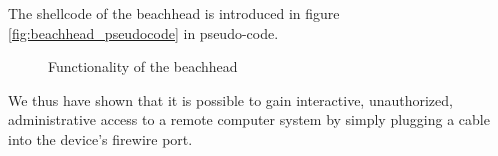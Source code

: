 The shellcode of the beachhead
is introduced in figure \ref{fig:beachhead_pseudocode} in pseudo-code. 

\begin{figure}[htb] \begin{center}

	\epsfysize 4.5cm


	\caption{Functionality of the beachhead}

	\label{fig:functionality_beachhead}

\end{center}\end{figure}


We thus have shown that it is possible to gain interactive, unauthorized,
administrative access to a remote computer system by simply plugging a cable
into the device's firewire port.


